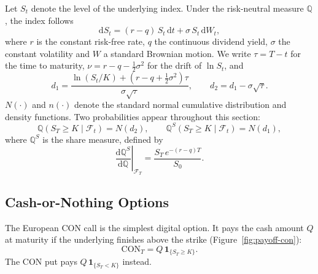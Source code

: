 \documentclass[11pt,a4paper]{article}
\theoremstyle{remark}
\newcommand{\ind}{\mathbf{1}}
\begin{document}
Let $S_t$ denote the level of the underlying index. Under the risk-neutral
measure $\mathbb{Q}$, the index follows
\begin{equation}
  \mathrm{d}S_t = (r-q)\,S_t\,\mathrm{d}t + \sigma\,S_t\,\mathrm{d}W_t,
  \label{eq:bs-sde}
\end{equation}
where $r$ is the constant risk-free rate, $q$ the continuous dividend yield,
$\sigma$ the constant volatility and $W$ a standard Brownian motion. We write
$\tau = T-t$ for the time to maturity, $\nu = r - q - \tfrac{1}{2}\sigma^2$ for
the drift of $\ln S_t$, and
\begin{equation}
  d_1 = \frac{\ln(S_t/K) + \left(r - q + \tfrac{1}{2}\sigma^2\right)\tau}{\sigma\sqrt{\tau}},
  \qquad
  d_2 = d_1 - \sigma\sqrt{\tau}.
  \label{eq:d1d2}
\end{equation}
$N(\cdot)$ and $n(\cdot)$ denote the standard normal cumulative distribution
and density functions. Two probabilities appear throughout this section:
\begin{equation}
  \mathbb{Q}\left(S_T \geq K \mid \mathcal{F}_t\right) = N(d_2),
  \qquad
  \mathbb{Q}^S\left(S_T \geq K \mid \mathcal{F}_t\right) = N(d_1),
  \label{eq:probas}
\end{equation}
where $\mathbb{Q}^S$ is the share measure, defined by
\begin{equation}
  \left.\frac{\mathrm{d}\mathbb{Q}^S}{\mathrm{d}\mathbb{Q}}\right|_{\mathcal{F}_T}
  = \frac{S_T\, e^{-(r-q)T}}{S_0}.
\end{equation}

\subsection{Cash-or-Nothing Options}
\label{subsec:con}

The European CON call is the simplest digital option. It pays the cash amount
$Q$ at maturity if the underlying finishes above the strike
(Figure~\ref{fig:payoff-con}):
\begin{equation}
  \mathrm{CON}_T = Q\,\ind_{\{S_T \geq K\}}.
  \label{eq:con-payoff}
\end{equation}
The CON put pays $Q\,\ind_{\{S_T < K\}}$ instead.
\end{document}
